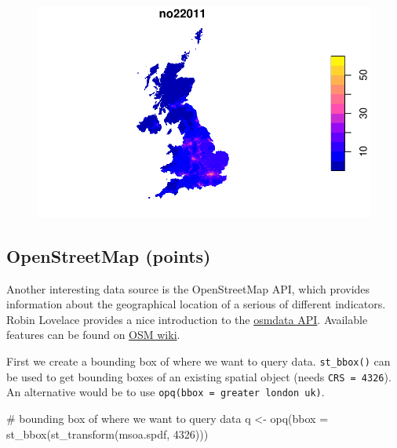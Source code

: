 \documentclass[
  letterpaper,
  DIV=11,
  numbers=noendperiod]{scrreprt}
\newenvironment{Shaded}{\begin{snugshade}}{\end{snugshade}}
\newcommand{\AttributeTok}[1]{\textcolor[rgb]{0.40,0.45,0.13}{#1}}
\newcommand{\CommentTok}[1]{\textcolor[rgb]{0.37,0.37,0.37}{#1}}
\newcommand{\DecValTok}[1]{\textcolor[rgb]{0.68,0.00,0.00}{#1}}
\newcommand{\FunctionTok}[1]{\textcolor[rgb]{0.28,0.35,0.67}{#1}}
\newcommand{\NormalTok}[1]{\textcolor[rgb]{0.00,0.23,0.31}{#1}}
\newcommand{\OtherTok}[1]{\textcolor[rgb]{0.00,0.23,0.31}{#1}}
\begin{document}
\begin{figure}[H]

{\centering \includegraphics{01_refresher_files/figure-pdf/unnamed-chunk-14-1.pdf}

}

\end{figure}

\hypertarget{openstreetmap-points}{%
\subsection{OpenStreetMap (points)}\label{openstreetmap-points}}

Another interesting data source is the OpenStreetMap API, which provides
information about the geographical location of a serious of different
indicators. Robin Lovelace provides a nice introduction to the
\href{https://cran.r-project.org/web/packages/osmdata/vignettes/osmdata.html}{osmdata
API}. Available features can be found on
\href{https://wiki.openstreetmap.org/wiki/Map_features}{OSM wiki}.

First we create a bounding box of where we want to query data.
\texttt{st\_bbox()} can be used to get bounding boxes of an existing
spatial object (needs \texttt{CRS\ =\ 4326}). An alternative would be to
use
\texttt{opq(bbox\ =\ \textquotesingle{}greater\ london\ uk\textquotesingle{})}.

\begin{Shaded}
\begin{Highlighting}[]
\CommentTok{\# bounding box of where we want to query data}
\NormalTok{q }\OtherTok{\textless{}{-}} \FunctionTok{opq}\NormalTok{(}\AttributeTok{bbox =} \FunctionTok{st\_bbox}\NormalTok{(}\FunctionTok{st\_transform}\NormalTok{(msoa.spdf, }\DecValTok{4326}\NormalTok{)))}
\end{Highlighting}
\end{Shaded}
\end{document}
